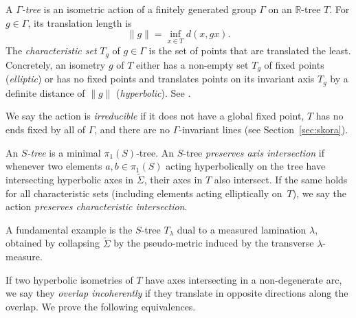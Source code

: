 \documentclass[11pt]{amsart}
\numberwithin{equation}{section}
\numberwithin{figure}{section}
\theoremstyle{definition}
\theoremstyle{plain}
\begin{document}
A \emph{$\Gamma$-tree} is an isometric action of a finitely generated
group $\Gamma$ on an $\mathbb{R}$-tree $T$. For $g\in\Gamma$, its
translation length is
\[
\|g\|=\inf_{x\in T} d(x,gx).
\]
The \emph{characteristic set} $T_g$ of $g \in \Gamma$ is the set of
points that are translated the least. Concretely,
an isometry $g$ of $T$ either has a non-empty set $T_g$ of fixed
points (\emph{elliptic}) or
has no fixed points and translates points on its invariant
axis $T_g$ by a definite distance of $\|g\|$
(\emph{hyperbolic}). See \cite[\S1.3]{CM87:GroupActions}.

We say the action is \emph{irreducible} if it does not have a global
fixed point, $T$ has no ends fixed by all of
$\Gamma$, and there are no $\Gamma$-invariant lines (see Section~\ref{sec:skora}).

An \emph{$S$-tree} is a minimal $\pi_1(S)$-tree.
An $S$-tree \emph{preserves axis intersection} if whenever two elements
$a,b\in\pi_1(S)$ acting hyperbolically on the tree have intersecting hyperbolic axes in
$\widetilde{\Sigma}$, their axes in $T$ also intersect.
If the same holds for all characteristic sets (including elements
acting elliptically on~$T$),
we say the action \emph{preserves characteristic intersection}.

A fundamental example is the $S$-tree $T_\lambda$ dual to a measured
lamination $\lambda$, obtained by collapsing $\widetilde{\Sigma}$
by the pseudo-metric induced by the transverse
$\lambda$-measure.
 
If two hyperbolic isometries of $T$ have axes intersecting in a
non-degenerate arc, we say they \emph{overlap incoherently} if they
translate in opposite directions along the overlap. We prove the following equivalences.
\end{document}

